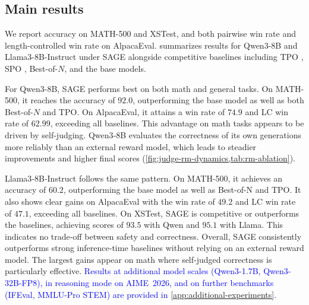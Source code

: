 \documentclass{article}
\theoremstyle{plain}
\theoremstyle{definition}
\theoremstyle{remark}
\newcommand{\method}{SAGE} %
\begin{document}
\subsection{Main results}
\noindent We report accuracy on MATH-500 and XSTest, and both pairwise win rate and length-controlled win rate on AlpacaEval.  summarizes results for Qwen3-8B and Llama3-8B-Instruct under \method{} alongside competitive baselines including TPO \citep{litest}, SPO \citep{xiang2025self}, Best-of-\(N\), and the base models.

For Qwen3-8B, \method{} performs best on both math and general tasks. On MATH-500, it reaches the accuracy of \(92.0\), outperforming the base model as well as both Best-of-\(N\) and TPO. On AlpacaEval, it attains a win rate of \(74.9\) and LC win rate of \(62.99\), exceeding all baselines.  This advantage on math tasks appears to be driven by self-judging. Qwen3‑8B evaluates the correctness of its own generations more reliably than an external reward model, which leads to steadier improvements and higher final scores (\cref{fig:judge-rm-dynamics,tab:rm-ablation}).

Llama3‑8B‑Instruct follows the same pattern. On MATH-500, it achieves an accuracy of \(60.2\), outperforming the base model as well as Best-of-N and TPO. It also shows clear gains on AlpacaEval with the win rate of \(49.2\) and LC win rate of \(47.1\), exceeding all baselines. On XSTest, \method{} is competitive or outperforms the baselines, achieving scores of \(93.5\) with Qwen and \(95.1\) with Llama. This indicates no trade‑off between safety and correctness. Overall, \method{} consistently outperforms strong inference‑time baselines without relying on an external reward model. The largest gains appear on math where self‑judged correctness is particularly effective. \textcolor{blue}{Results at additional model scales (Qwen3-1.7B, Qwen3-32B-FP8), in reasoning mode on AIME~2026, and on further benchmarks (IFEval, MMLU-Pro STEM) are provided in \cref{app:additional-experiments}.}
\end{document}
